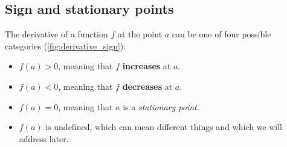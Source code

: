 \subsection{Sign and stationary points}
\label{sub:sign and stationary points}
The derivative of a function $f$ at the point $a$ can be one of four possible categories (\autoref{fig:derivative_sign}):
\begin{itemize}
  \item $f(a)>0$, meaning that $f$ \textbf{increases} at $a$.
  \item $f(a)<0$, meaning that $f$ \textbf{decreases} at $a$.
  \item $f(a)=0$, meaning that $a$ is a \emph{stationary point}.
  \item $f(a)$ is undefined, which can mean different things and which we will address later.
\end{itemize}

